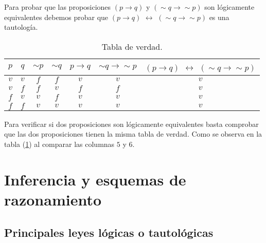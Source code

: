 \solu Para probar que las proposiciones $(p\rightarrow q)$ y $(\sim q\rightarrow\sim p)$
son lógicamente equivalentes debemos probar que $(p\rightarrow q)$
$\leftrightarrow$ $(\sim q\rightarrow\sim p)$ es una tautología.
\begin{table}[H]
\centering

\caption{Tabla de verdad.}
\label{equil1}

\begin{tabular}{c|c|c|c|c|c|c}
\arrayrulecolor{ptctitle}\cellcolor{ptctitle!50}$p$ &
\cellcolor{ptctitle!50}$q$ &
\cellcolor{ptctitle!50}$\sim p$ &
\cellcolor{ptctitle!50}$\sim q$ &
\cellcolor{ptctitle!50}$p\rightarrow q$ &
\cellcolor{ptctitle!50}\foreignlanguage{english}{$\sim q\rightarrow\sim p$} &
\cellcolor{ptctitle!50}$(p\rightarrow q)$ $\leftrightarrow$ $(\sim q\rightarrow\sim p)$\tabularnewline
\hline 
\cellcolor{ptcbackground} $v$ &
\cellcolor{ptcbackground}$v$ &
\cellcolor{ptcbackground}$f$ &
\cellcolor{ptcbackground}$f$ &
\cellcolor{ptcbackground}$v$ &
\cellcolor{ptcbackground}$v$ &
\cellcolor{ptcbackground}$v$\tabularnewline
\hline 
\cellcolor{gray!50}$v$ &
\cellcolor{gray!50} $f$ &
\cellcolor{gray!50}$f$ &
\cellcolor{gray!50}$v$ &
\cellcolor{gray!50}$f$ &
\cellcolor{gray!50}$f$ &
\cellcolor{gray!50}$v$\tabularnewline
\hline 
\cellcolor{ptcbackground}$f$ &
\cellcolor{ptcbackground} $v$ &
\cellcolor{ptcbackground} $v$ &
\cellcolor{ptcbackground}$f$ &
\cellcolor{ptcbackground}$v$ &
\cellcolor{ptcbackground}$v$ &
\cellcolor{ptcbackground}$v$\tabularnewline
\hline 
\cellcolor{gray!50} $f$ &
\cellcolor{gray!50} $f$ &
\cellcolor{gray!50} $v$ &
\cellcolor{gray!50}$v$ &
\cellcolor{gray!50}$v$ &
\cellcolor{gray!50}$v$ &
\cellcolor{gray!50}$v$\tabularnewline
\hline 
\end{tabular}
\end{table}

\obs Para verificar si dos proposiciones son lógicamente equivalentes
basta comprobar que las dos proposiciones tienen la misma tabla de
verdad. Como se observa en la tabla (\ref{equil1}) al comparar las
columnas $5$ y $6$.

\section{Inferencia y esquemas de razonamiento}

\subsection{Principales leyes lógicas o tautológicas}

